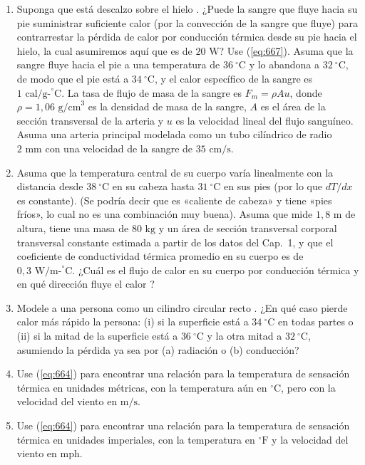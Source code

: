 \documentclass[12pt]{book}
\begin{document}
\begin{enumerate}
\item[6.108] Suponga que está descalzo sobre el hielo \cite{69}. ¿Puede la sangre que fluye hacia su pie suministrar suficiente calor (por la convección de la sangre que fluye) para contrarrestar la pérdida de calor por conducción térmica desde su pie hacia el hielo, la cual asumiremos aquí que es de $20\text{ W}$? Use (\ref{eq:667}). Asuma que la sangre fluye hacia el pie a una temperatura de $36\ ^\circ\text{C}$ y lo abandona a $32\ ^\circ\text{C}$, de modo que el pie está a $34\ ^\circ\text{C}$, y el calor específico de la sangre es $1\text{ cal/g-}^\circ\text{C}$. La tasa de flujo de masa de la sangre es $F_m = \rho A u$, donde $\rho = 1{,}06\text{ g/cm}^3$ es la densidad de masa de la sangre, $A$ es el área de la sección transversal de la arteria y $u$ es la velocidad lineal del flujo sanguíneo. Asuma una arteria principal modelada como un tubo cilíndrico de radio $2\text{ mm}$ con una velocidad de la sangre de $35\text{ cm/s}$.

\item[6.109] Asuma que la temperatura central de su cuerpo varía linealmente con la distancia desde $38\ ^\circ\text{C}$ en su cabeza hasta $31\ ^\circ\text{C}$ en sus pies (por lo que $dT/dx$ es constante). (Se podría decir que es «caliente de cabeza» y tiene «pies fríos», lo cual no es una combinación muy buena). Asuma que mide $1{,}8\text{ m}$ de altura, tiene una masa de $80\text{ kg}$ y un área de sección transversal corporal transversal constante estimada a partir de los datos del Cap.~1, y que el coeficiente de conductividad térmica promedio en su cuerpo es de $0{,}3\text{ W/m-}^\circ\text{C}$. ¿Cuál es el flujo de calor en su cuerpo por conducción térmica y en qué dirección fluye el calor \cite{69}?

\item[6.110] Modele a una persona como un cilindro circular recto \cite{69}. ¿En qué caso pierde calor más rápido la persona: (i) si la superficie está a $34\ ^\circ\text{C}$ en todas partes o (ii) si la mitad de la superficie está a $36\ ^\circ\text{C}$ y la otra mitad a $32\ ^\circ\text{C}$, asumiendo la pérdida ya sea por (a) radiación o (b) conducción?

\item[6.111] Use (\ref{eq:664}) para encontrar una relación para la temperatura de sensación térmica en unidades métricas, con la temperatura aún en $^\circ\text{C}$, pero con la velocidad del viento en $\text{m/s}$.

\item[6.112] Use (\ref{eq:664}) para encontrar una relación para la temperatura de sensación térmica en unidades imperiales, con la temperatura en $^\circ\text{F}$ y la velocidad del viento en $\text{mph}$.


\end{enumerate}
\end{document}
